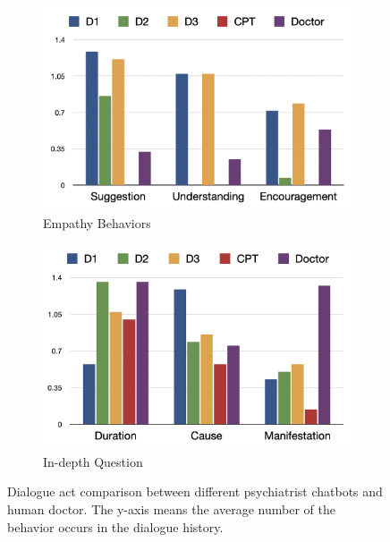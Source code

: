\begin{figure}[th]
 	\centering
	\begin{subfigure}{0.36\linewidth}
		\centering
		\includegraphics[width=\linewidth]{Figures/empathy.png}
		\caption{Empathy Behaviors}
		\label{fig:emp_simu_doctor}%
	\end{subfigure}
	\centering
	\begin{subfigure}{0.36\linewidth}
		\centering
		\includegraphics[width=\linewidth]{Figures/indepth.png}
		\caption{In-depth Question} 
		\label{fig:indepth_simu_doctor}%
	\end{subfigure}
	\caption{Dialogue act comparison between different psychiatrist chatbots and human doctor. The y-axis means the average number of the behavior occurs in the dialogue history.
 }
	\label{fig:doctor_chatbot_statistics}
\end{figure}

